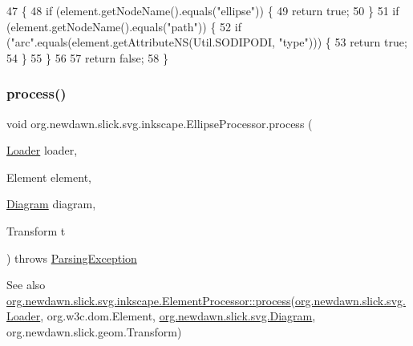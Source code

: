 \begin{DoxyCode}
47                                             \{
48         \textcolor{keywordflow}{if} (element.getNodeName().equals(\textcolor{stringliteral}{"ellipse"})) \{
49             \textcolor{keywordflow}{return} \textcolor{keyword}{true};
50         \}
51         \textcolor{keywordflow}{if} (element.getNodeName().equals(\textcolor{stringliteral}{"path"})) \{
52             \textcolor{keywordflow}{if} (\textcolor{stringliteral}{"arc"}.equals(element.getAttributeNS(Util.SODIPODI, \textcolor{stringliteral}{"type"}))) \{
53                 \textcolor{keywordflow}{return} \textcolor{keyword}{true};
54             \}
55         \}
56         
57         \textcolor{keywordflow}{return} \textcolor{keyword}{false};
58     \}
\end{DoxyCode}
\mbox{\label{classorg_1_1newdawn_1_1slick_1_1svg_1_1inkscape_1_1_ellipse_processor_aa1d099c3b7ce4be328ccde1a5a2d1fb7}} 
\subsubsection{\texorpdfstring{process()}{process()}}
{\footnotesize\ttfamily void org.\+newdawn.\+slick.\+svg.\+inkscape.\+Ellipse\+Processor.\+process (\begin{DoxyParamCaption}\item[{\mbox{\hyperlink{interfaceorg_1_1newdawn_1_1slick_1_1svg_1_1_loader}{Loader}}}]{loader,  }\item[{Element}]{element,  }\item[{\mbox{\hyperlink{classorg_1_1newdawn_1_1slick_1_1svg_1_1_diagram}{Diagram}}}]{diagram,  }\item[{Transform}]{t }\end{DoxyParamCaption}) throws \mbox{\hyperlink{classorg_1_1newdawn_1_1slick_1_1svg_1_1_parsing_exception}{Parsing\+Exception}}\hspace{0.3cm}{\ttfamily [inline]}}

\begin{DoxySeeAlso}{See also}
\mbox{\hyperlink{interfaceorg_1_1newdawn_1_1slick_1_1svg_1_1inkscape_1_1_element_processor_acd170a9e1119481edae885780db59a2e}{org.\+newdawn.\+slick.\+svg.\+inkscape.\+Element\+Processor\+::process}}(\mbox{\hyperlink{interfaceorg_1_1newdawn_1_1slick_1_1svg_1_1_loader}{org.\+newdawn.\+slick.\+svg.\+Loader}}, org.\+w3c.\+dom.\+Element, \mbox{\hyperlink{classorg_1_1newdawn_1_1slick_1_1svg_1_1_diagram}{org.\+newdawn.\+slick.\+svg.\+Diagram}}, org.\+newdawn.\+slick.\+geom.\+Transform) 
\end{DoxySeeAlso}



